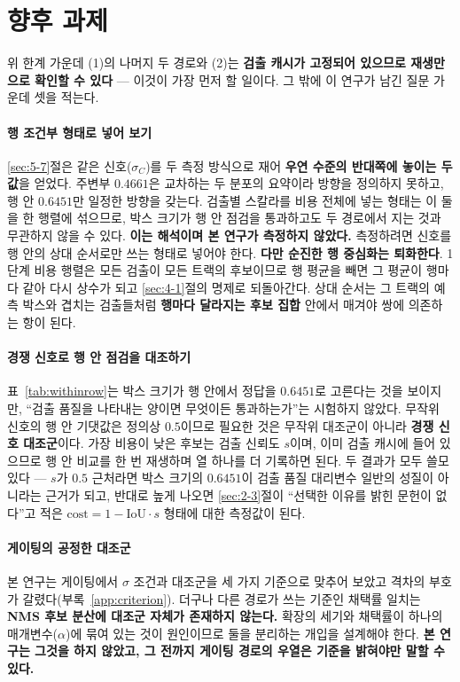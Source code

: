 \documentclass[12pt,a4paper,oneside]{report}
\begin{document}
\section{향후 과제}\label{sec:7-4}

위 한계 가운데 (1)의 나머지 두 경로와 (2)는 \textbf{검출 캐시가 고정되어 있으므로 재생만으로 확인할 수 있다} --- 이것이 가장 먼저 할 일이다. 그 밖에 이 연구가 남긴 질문 가운데 셋을 적는다.

\paragraph{행 조건부 형태로 넣어 보기} \ref{sec:5-7}절은 같은 신호($\sigma_C$)를 두 측정 방식으로 재어 \textbf{우연 수준의 반대쪽에 놓이는 두 값}을 얻었다. 주변부 $0.4661$은 교차하는 두 분포의 요약이라 방향을 정의하지 못하고, 행 안 $0.6451$만 일정한 방향을 갖는다. 검출별 스칼라를 비용 전체에 넣는 형태는 이 둘을 한 행렬에 섞으므로, 박스 크기가 행 안 점검을 통과하고도 두 경로에서 지는 것과 무관하지 않을 수 있다. \textbf{이는 해석이며 본 연구가 측정하지 않았다.} 측정하려면 신호를 행 안의 상대 순서로만 쓰는 형태로 넣어야 한다. \textbf{다만 순진한 행 중심화는 퇴화한다}. 1단계 비용 행렬은 모든 검출이 모든 트랙의 후보이므로 행 평균을 빼면 그 평균이 행마다 같아 다시 상수가 되고 \ref{sec:4-1}절의 명제로 되돌아간다. 상대 순서는 그 트랙의 예측 박스와 겹치는 검출들처럼 \textbf{행마다 달라지는 후보 집합} 안에서 매겨야 쌍에 의존하는 항이 된다.

\paragraph{경쟁 신호로 행 안 점검을 대조하기} 표~\ref{tab:withinrow}는 박스 크기가 행 안에서 정답을 $0.6451$로 고른다는 것을 보이지만, ``검출 품질을 나타내는 양이면 무엇이든 통과하는가''는 시험하지 않았다. 무작위 신호의 행 안 기댓값은 정의상 $0.5$이므로 필요한 것은 무작위 대조군이 아니라 \textbf{경쟁 신호 대조군}이다. 가장 비용이 낮은 후보는 검출 신뢰도 $s$이며, 이미 검출 캐시에 들어 있으므로 행 안 비교를 한 번 재생하며 열 하나를 더 기록하면 된다. 두 결과가 모두 쓸모 있다 --- $s$가 $0.5$ 근처라면 박스 크기의 $0.6451$이 검출 품질 대리변수 일반의 성질이 아니라는 근거가 되고, 반대로 높게 나오면 \ref{sec:2-3}절이 ``선택한 이유를 밝힌 문헌이 없다''고 적은 $\mathrm{cost} = 1 - \mathrm{IoU} \cdot s$ 형태에 대한 측정값이 된다.

\paragraph{게이팅의 공정한 대조군} 본 연구는 게이팅에서 $\sigma$ 조건과 대조군을 세 가지 기준으로 맞추어 보았고 격차의 부호가 갈렸다(부록~\ref{app:criterion}). 더구나 다른 경로가 쓰는 기준인 채택률 일치는 \textbf{NMS 후보 분산에 대조군 자체가 존재하지 않는다.} 확장의 세기와 채택률이 하나의 매개변수($\alpha$)에 묶여 있는 것이 원인이므로 둘을 분리하는 개입을 설계해야 한다. \textbf{본 연구는 그것을 하지 않았고, 그 전까지 게이팅 경로의 우열은 기준을 밝혀야만 말할 수 있다.}
\end{document}
